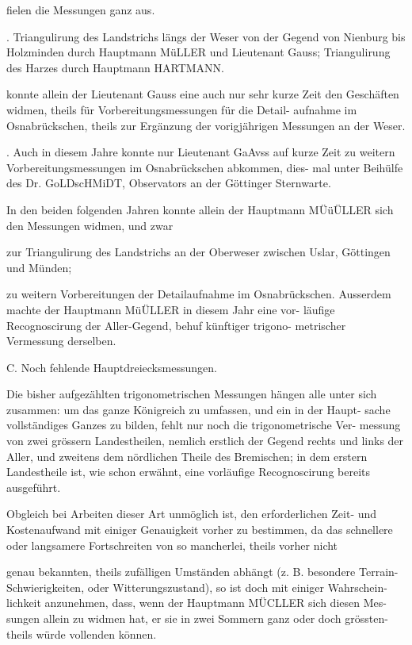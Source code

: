 \documentclass[12pt,a4paper]{article}
\theoremstyle{plain}
\theoremstyle{definition}
\theoremstyle{remark}
\begin{document}
 fielen die Messungen ganz aus.

. Triangulirung des Landstrichs längs der Weser von der Gegend von
Nienburg bis Holzminden durch Hauptmann MüLLER und Lieutenant
Gauss; Triangulirung des Harzes durch Hauptmann HARTMANN.

 konnte allein der Lieutenant Gauss eine auch nur sehr kurze Zeit den
Geschäften widmen, theils für Vorbereitungsmessungen für die Detail-
aufnahme im Osnabrückschen, theils zur Ergänzung der vorigjährigen
Messungen an der Weser.

. Auch in diesem Jahre konnte nur Lieutenant GaAvss auf kurze Zeit zu
weitern Vorbereitungsmessungen im Osnabrückschen abkommen, dies-
mal unter Beihülfe des Dr. GoLDscHMiDT, Observators an der Göttinger
Sternwarte.

\noindent
In den beiden folgenden Jahren konnte allein der Hauptmann MÜüÜLLER
sich den Messungen widmen, und zwar

 zur Triangulirung des Landstrichs an der Oberweser zwischen Uslar,
Göttingen und Münden;

 zu weitern Vorbereitungen der Detailaufnahme im Osnabrückschen.
Ausserdem machte der Hauptmann MüÜLLER in diesem Jahr eine vor-
läufige Recognoscirung der Aller-Gegend, behuf künftiger trigono-
metrischer Vermessung derselben.

\noindent
C. Noch fehlende Hauptdreiecksmessungen.

\noindent
Die bisher aufgezählten trigonometrischen Messungen hängen alle unter
sich zusammen: um das ganze Königreich zu umfassen, und ein in der Haupt-
sache vollständiges Ganzes zu bilden, fehlt nur noch die trigonometrische Ver-
messung von zwei grössern Landestheilen, nemlich erstlich der Gegend rechts
und links der Aller, und zweitens dem nördlichen Theile des Bremischen; in
dem erstern Landestheile ist, wie schon erwähnt, eine vorläufige Recognoscirung
bereits ausgeführt.

\noindent
Obgleich bei Arbeiten dieser Art unmöglich ist, den erforderlichen Zeit-
und Kostenaufwand mit einiger Genauigkeit vorher zu bestimmen, da das
schnellere oder langsamere Fortschreiten von so mancherlei, theils vorher nicht

\noindent

\noindent
genau bekannten, theils zufälligen Umständen abhängt (z. B. besondere Terrain-
Schwierigkeiten, oder Witterungszustand), so ist doch mit einiger Wahrschein-
lichkeit anzunehmen, dass, wenn der Hauptmann MÜCLLER sich diesen Mes-
sungen allein zu widmen hat, er sie in zwei Sommern ganz oder doch grössten-
theils würde vollenden können.
\end{document}
